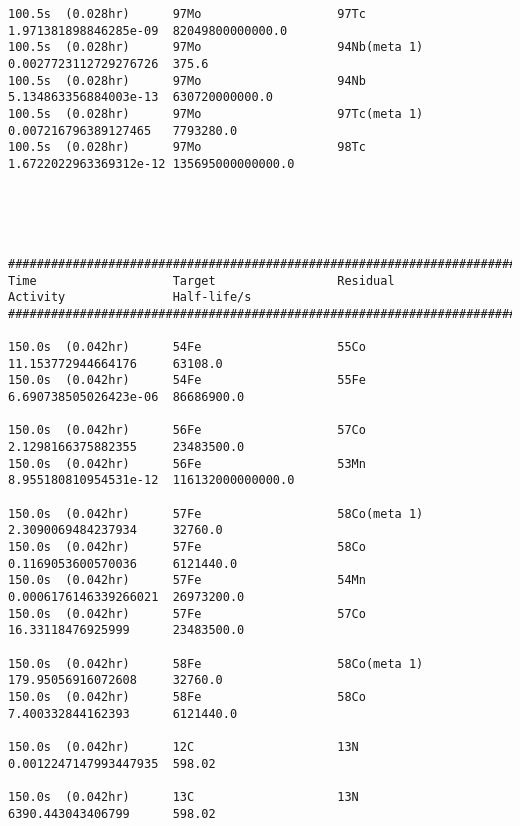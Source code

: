 \begin{lstlisting}[style=sOutputFile,caption={Final results for steel irradiation},label={listing:alexsteel}]
100.5s  (0.028hr)      97Mo                   97Tc                   1.971381898846285e-09  82049800000000.0      
100.5s  (0.028hr)      97Mo                   94Nb(meta 1)           0.0027723112729276726  375.6                 
100.5s  (0.028hr)      97Mo                   94Nb                   5.134863356884003e-13  630720000000.0        
100.5s  (0.028hr)      97Mo                   97Tc(meta 1)           0.007216796389127465   7793280.0             
100.5s  (0.028hr)      97Mo                   98Tc                   1.6722022963369312e-12 135695000000000.0     





####################################################################################################################
Time                   Target                 Residual               Activity               Half-life/s            
####################################################################################################################

150.0s  (0.042hr)      54Fe                   55Co                   11.153772944664176     63108.0               
150.0s  (0.042hr)      54Fe                   55Fe                   6.690738505026423e-06  86686900.0            

150.0s  (0.042hr)      56Fe                   57Co                   2.1298166375882355     23483500.0            
150.0s  (0.042hr)      56Fe                   53Mn                   8.955180810954531e-12  116132000000000.0     

150.0s  (0.042hr)      57Fe                   58Co(meta 1)           2.3090069484237934     32760.0               
150.0s  (0.042hr)      57Fe                   58Co                   0.1169053600570036     6121440.0             
150.0s  (0.042hr)      57Fe                   54Mn                   0.0006176146339266021  26973200.0            
150.0s  (0.042hr)      57Fe                   57Co                   16.33118476925999      23483500.0            

150.0s  (0.042hr)      58Fe                   58Co(meta 1)           179.95056916072608     32760.0               
150.0s  (0.042hr)      58Fe                   58Co                   7.400332844162393      6121440.0             

150.0s  (0.042hr)      12C                    13N                    0.0012247147993447935  598.02                

150.0s  (0.042hr)      13C                    13N                    6390.443043406799      598.02                


\end{lstlisting}
